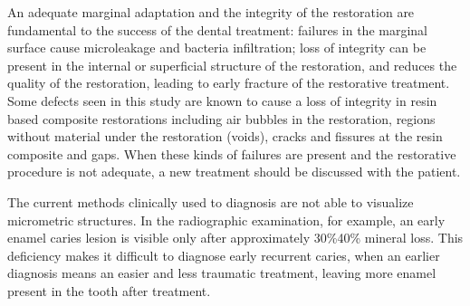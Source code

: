 \documentclass[12pt,twoside,english]{book}
\renewcommand{\~}{\perispomeni}%
\numberwithin{equation}{section}
\numberwithin{figure}{section}
\begin{document}
An adequate marginal adaptation and the integrity of the restoration are fundamental to the success of the dental treatment: failures in the marginal surface cause microleakage and bacteria infiltration; loss of integrity can be present in the internal or superficial structure of the restoration, and reduces the quality of the restoration, leading to early fracture of the restorative treatment. Some defects seen in this study are known to cause a loss of integrity in resin based composite restorations including air bubbles in the restoration, regions without material under the restoration (voids), cracks and fissures at the resin composite and gaps. When these kinds of failures are present and the restorative procedure is not adequate, a new treatment should be discussed with the patient.


The current methods clinically used to diagnosis are not able to visualize micrometric structures. In the radiographic examination, for example, an early enamel caries lesion is visible only after approximately 30\%\textendash{}40\% mineral loss\cite{White:2000p2224}. This deficiency makes it difficult to diagnose early recurrent caries, when an earlier diagnosis means an easier and less traumatic treatment, leaving more enamel present in the tooth after treatment.
\end{document}
